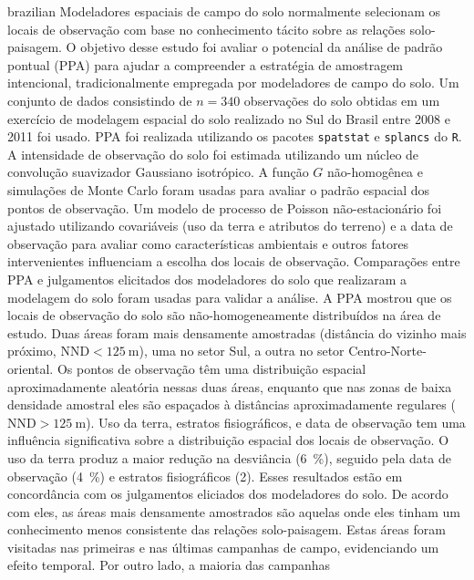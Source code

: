 \begin{chapterabstract}{brazilian}{\ptkeys}
Modeladores espaciais de campo do solo normalmente selecionam os locais de observação com base no 
conhecimento tácito sobre as relações solo-paisagem. O objetivo desse estudo foi avaliar o potencial da 
análise de padrão pontual (PPA) para ajudar a compreender a estratégia de amostragem intencional, 
tradicionalmente empregada por modeladores de campo do solo. Um conjunto de dados consistindo de $n = 340$ 
observações do solo obtidas em um exercício de modelagem espacial do solo realizado no Sul do Brasil entre 
\num{2008} e \num{2011} foi usado. PPA foi realizada utilizando os pacotes \texttt{spatstat} e 
\texttt{splancs} do \texttt{R}. A intensidade de observação do solo foi estimada utilizando um núcleo de 
convolução suavizador Gaussiano isotrópico. A função $G$ não-homogênea e simulações de Monte Carlo foram 
usadas para avaliar o padrão espacial dos pontos de observação. Um modelo de processo de Poisson 
não-estacionário foi ajustado utilizando covariáveis (uso da terra e atributos do terreno) e a data de 
observação para avaliar como características ambientais e outros fatores intervenientes influenciam a escolha 
dos locais de observação. Comparações entre PPA e julgamentos elicitados dos modeladores do solo que 
realizaram a modelagem do solo foram usadas para validar a análise. A PPA mostrou que os locais de observação 
do solo são não-homogeneamente distribuídos na área de estudo. Duas áreas foram mais densamente amostradas 
(distância do vizinho mais próximo, $\text{NND} < \SI{125}{\m}$), uma no setor Sul, a outra no setor 
Centro-Norte-oriental. Os pontos de observação têm uma distribuição espacial aproximadamente aleatória nessas 
duas áreas, enquanto que nas zonas de baixa densidade amostral eles são espaçados à distâncias aproximadamente 
regulares ($\text{NND} > \SI{125}{\m}$). Uso da terra, estratos fisiográficos, e data de observação tem uma 
influência significativa sobre a distribuição espacial dos locais de observação. O uso da terra produz a maior 
redução na desviância (\SI{6}{\percent}), seguido pela data de observação (\SI{4}{\percent}) e estratos 
fisiográficos (\SI{2}{\cento}). Esses resultados estão em concordância com os julgamentos eliciados dos 
modeladores do solo. De acordo com eles, as áreas mais densamente amostrados são aquelas onde eles tinham um 
conhecimento menos consistente das relações solo-paisagem. Estas áreas foram visitadas nas primeiras e nas 
últimas campanhas de campo, evidenciando um efeito temporal. Por outro lado, a maioria das campanhas 

\end{chapterabstract}
